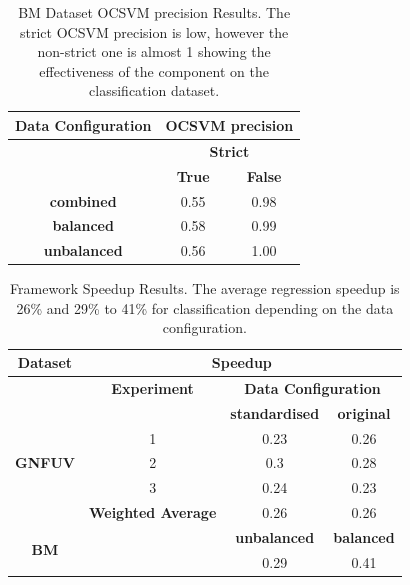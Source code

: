 \documentclass{mpaper}
\begin{document}
\begin{table}[]
\centering
\begin{tabular}{|c|cc|}
\hline
\textbf{Data Configuration} & \multicolumn{2}{c|}{\textbf{OCSVM precision}} \\ \hline
\textbf{}                     & \multicolumn{2}{c|}{\textbf{Strict}}          \\ \cline{2-3} 
\textbf{}                     & \textbf{True}         & \textbf{False}        \\ \hline
\textbf{combined}             & 0.55                  & 0.98                  \\
\textbf{balanced}             & 0.58                  & 0.99                  \\
\textbf{unbalanced}           & 0.56                  & 1.00                  \\ \hline
\end{tabular}
\caption{\label{tab:bm_ocsvm_precision}BM Dataset OCSVM precision Results. The strict OCSVM precision is low, however the non-strict one is almost 1 showing the effectiveness of the component on the classification dataset.}
\end{table}


\begin{table}[]
\centering
\begin{tabular}{|c|ccc|}
\hline
\textbf{Dataset}             & \multicolumn{3}{c|}{\textbf{Speedup}}                                                             \\ \hline
                             & \multicolumn{1}{c|}{\textbf{Experiment}}       & \multicolumn{2}{c|}{\textbf{Data Configuration}} \\ \cline{2-4} 
                             & \multicolumn{1}{l|}{}                          & \textbf{standardised}     & \textbf{original}    \\ \cline{2-4} 
                             & \multicolumn{1}{c|}{1}                         & 0.23                      & 0.26                 \\
\textbf{GNFUV}               & \multicolumn{1}{c|}{2}                         & 0.3                       & 0.28                 \\
                             & \multicolumn{1}{c|}{3}                         & 0.24                      & 0.23                 \\ \cline{2-4} 
                             & \multicolumn{1}{c|}{\textbf{Weighted Average}} & 0.26                      & 0.26                 \\ \hline
\multirow{2}{*}{\textbf{BM}} & \multicolumn{1}{l|}{}                          & \textbf{unbalanced}       & \textbf{balanced}    \\ \cline{3-4} 
                             & \multicolumn{1}{c|}{\textbf{}}                 & 0.29                      & 0.41                 \\ \hline
\end{tabular}
\caption{\label{tab:speedup}Framework Speedup Results. The average regression speedup is 26\% and 29\% to 41\% for classification depending on the data configuration.}
\end{table}
\end{document}
